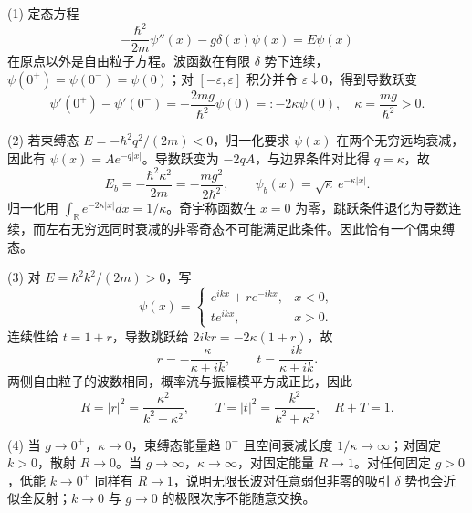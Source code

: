 (1) 定态方程
\[
-\frac{\hbar^2}{2m}\psi''(x)-g\delta(x)\psi(x)=E\psi(x)
\]
在原点以外是自由粒子方程。波函数在有限 \(\delta \) 势下连续，\(\psi(0^+)=\psi(0^-)=\psi(0)\)；对 \([-\varepsilon,\varepsilon]\) 积分并令 \(\varepsilon\downarrow0\)，得到导数跃变
\[
\psi'(0^+)-\psi'(0^-)=-\frac{2mg}{\hbar^2}\psi(0)=:-2\kappa\psi(0),
\quad\kappa=\frac{mg}{\hbar^2}>0.
\]

(2) 若束缚态 \(E=-\hbar^2q^2/(2m)<0\)，归一化要求 \(\psi(x)\) 在两个无穷远均衰减，因此有 \(\psi(x)=A e^{-q|x|}\)。导数跃变为 \(-2qA\)，与边界条件对比得 \(q=\kappa\)，故
\[
E_b=-\frac{\hbar^2\kappa^2}{2m}=-\frac{mg^2}{2\hbar^2},\qquad
\psi_b(x)=\sqrt\kappa\,e^{-\kappa|x|}.
\]
归一化用 \(\int_{\mathbb R}e^{-2\kappa|x|}dx=1/\kappa\)。奇宇称函数在 \(x=0\) 为零，跳跃条件退化为导数连续，而左右无穷远同时衰减的非零奇态不可能满足此条件。因此恰有一个偶束缚态。

(3) 对 \(E=\hbar^2k^2/(2m)>0\)，写
\[
\psi(x)=
\begin{cases}
e^{ikx}+r e^{-ikx},&x<0,\\
t e^{ikx},&x>0.
\end{cases}
\]
连续性给 \(t=1+r\)，导数跳跃给 \(2ikr=-2\kappa(1+r)\)，故
\[
r=-\frac{\kappa}{\kappa+ik},\qquad
t=\frac{ik}{\kappa+ik}.
\]
两侧自由粒子的波数相同，概率流与振幅模平方成正比，因此
\[
R=|r|^2=\frac{\kappa^2}{k^2+\kappa^2},\qquad
T=|t|^2=\frac{k^2}{k^2+\kappa^2},\quad R+T=1.
\]

(4) 当 \(g\to0^+\)，\(\kappa\to0\)，束缚态能量趋 \(0^-\) 且空间衰减长度 \(1/\kappa\to\infty\)；对固定 \(k>0\)，散射 \(R\to0\)。当 \(g\to\infty\)，\(\kappa\to\infty\)，对固定能量 \(R\to1\)。对任何固定 \(g>0\)，低能 \(k\to0^+\) 同样有 \(R\to1\)，说明无限长波对任意弱但非零的吸引 \(\delta \) 势也会近似全反射；\(k\to0\) 与 \(g\to0\) 的极限次序不能随意交换。
